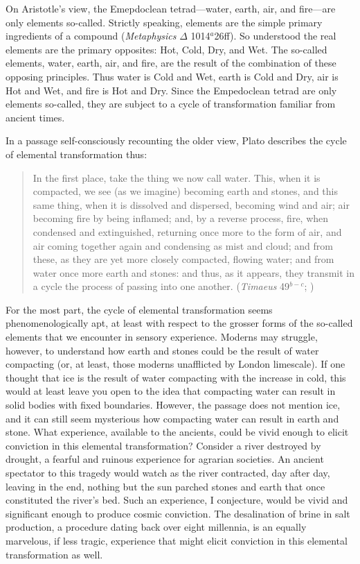 On Aristotle's view, the Emepdoclean tetrad---water, earth, air, and fire---are only elements so-called. Strictly speaking, elements are the simple primary ingredients of a compound (\emph{Metaphysics} \( \Delta \) 1014\( ^{a} \)26ff). So understood the real elements are the primary opposites: Hot, Cold, Dry, and Wet. The so-called elements, water, earth, air, and fire, are the result of the combination of these opposing principles. Thus water is Cold and Wet, earth is Cold and Dry, air is Hot and Wet, and fire is Hot and Dry. Since the Empedoclean tetrad are only elements so-called, they are subject to a cycle of transformation familiar from ancient times. 

In a passage self-consciously recounting the older view, Plato describes the cycle of elemental transformation thus:
\begin{quote}
	In the first place, take the thing we now call water. This, when it is compacted, we see (as we imagine) becoming earth and stones, and this same thing, when it is dissolved and dispersed, becoming wind and air; air becoming fire by being inflamed; and, by a reverse process, fire, when condensed and extinguished, returning once more to the form of air, and air coming together again and condensing as mist and cloud; and from these, as they are yet more closely compacted, flowing water; and from water once more earth and stones: and thus, as it appears, they transmit in a cycle the process of passing into one another. (\emph{Timaeus} 49\( ^{b-c} \); \citealt[179]{Cornford:1935fk})
\end{quote}
For the most part, the cycle of elemental transformation seems phenomenologically apt, at least with respect to the grosser forms of the so-called elements that we encounter in sensory experience. Moderns may struggle, however, to understand how earth and stones could be the result of water compacting (or, at least, those moderns unafflicted by London limescale). If one thought that ice is the result of water compacting with the increase in cold, this would at least leave you open to the idea that compacting water can result in solid bodies with fixed boundaries. However, the passage does not mention ice, and it can still seem mysterious how compacting water can result in earth and stone. What experience, available to the ancients, could be vivid enough to elicit conviction in this elemental transformation? Consider a river destroyed by drought, a fearful and ruinous experience for agrarian societies. An ancient spectator to this tragedy would watch as the river contracted, day after day, leaving in the end, nothing but the sun parched stones and earth that once constituted the river's bed. Such an experience, I conjecture, would be vivid and significant enough to produce cosmic conviction. The desalination of brine in salt production, a procedure dating back over eight millennia, is an equally marvelous, if less tragic, experience that might elicit conviction in this elemental transformation as well.

